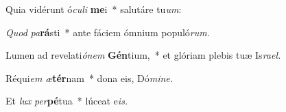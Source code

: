 \item Quia vidérunt ó\textit{culi} \textbf{me}i~* salutáre tu\textit{um}:
\item \textit{Quod} \textit{pa}\textbf{rá}sti~* ante fáciem ómnium populó\textit{rum}.
\item Lumen ad revelati\textit{ónem} \textbf{Gén}tium,~* et glóriam plebis tuæ Is\textit{rael.}
\item Réqui\hspace*{0.03em}\textit{em} \textit{æ}\textbf{tér}nam~* dona eis, Dó\textit{mine.}
\item Et \textit{lux} \textit{per}\textbf{pé}tua~* lúceat e\hspace*{0.03em}\textit{is.}